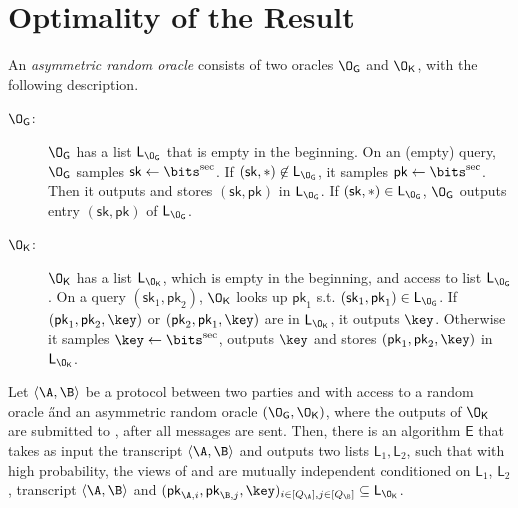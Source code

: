 \section{Optimality of the Result}

\newcommand{\OG}{\ensuremath{\O_{\mathsf{G}}}\xspace}
\newcommand{\OK}{\ensuremath{\O_{\mathsf{K}}}\xspace}
\newcommand{\sk}{\ensuremath{\mathsf{sk}}\xspace}
\newcommand{\pk}{\ensuremath{\mathsf{pk}}\xspace}
\renewcommand{\L}{\ensuremath{\mathsf{L}}\xspace}
\newcommand{\LOG}{\ensuremath{\L_{\OG}}\xspace}
\newcommand{\LOK}{\ensuremath{\L_{\OK}}\xspace}
\newcommand{\E}{\ensuremath{\mathsf{E}}\xspace}



\begin{definition}
An \emph{asymmetric random oracle} consists of two oracles \OG and \OK, with the following description.
\begin{description}
\item[\OG:] \OG has a list \LOG that is empty in the beginning. On an (empty) query, \OG samples $\sk\leftarrow\bits^{\sec}$. If $(\sk,*)\not\in\LOG$, it samples  $\pk\leftarrow\bits^{\sec}$. Then it outputs and stores  $(\sk,\pk)$ in \LOG. If $(\sk,*)\in\LOG$, \OG outputs entry $(\sk,\pk)$ of \LOG.
\item[\OK:] \OK has a list \LOK, which is empty in the beginning, and access to list \LOG. On a query $(\sk_1,\pk_2)$, \OK looks up $\pk_1$ s.t. $(\sk_1,\pk_1)\in\LOG$. If $(\pk_1,\pk_2,\key)$ or $(\pk_2,\pk_1,\key)$ are in \LOK, it outputs $\key$. Otherwise it samples $\key\leftarrow\bits^{\sec}$, outputs $\key$ and stores $(\pk_1,\pk_2,\key)$ in \LOK.  
\end{description} 
\end{definition}

\begin{lemma}
Let $\langle \A, \B\rangle$ be a protocol between two parties \A and \B with access to a random oracle \H and an asymmetric random oracle $(\OG, \OK)$, where the outputs of \OK are submitted to \A, \B after all messages are sent. Then, there is an algorithm \E that takes as input the transcript $\langle \A, \B\rangle$ and outputs two lists $\L_1, \L_2$, such that with high probability, the views of \A and \B are mutually independent conditioned on $\L_1$, $\L_2$, transcript $\langle \A, \B\rangle$ and $(\pk_{\A,i},\pk_{\B,j},\key)_{i\in[Q_{\A}],j\in[Q_{\B}]}\subseteq\LOK$.
\end{lemma}

